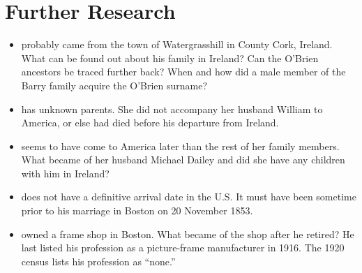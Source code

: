 \chapter{Further Research}

\begin{itemize}

	\item{} probably came from the town of Watergrasshill in County Cork, Ireland. What can be found out about his family in Ireland? Can the O'Brien ancestors be traced further back? When and how did a male member of the Barry family acquire the O'Brien surname?

	\item{} has unknown parents. She did not accompany her husband William to America, or else had died before his departure from Ireland. 

	\item{} seems to have come to America later than the rest of her family members. What became of her husband Michael Dailey and did she have any children with him in Ireland?

	\item{} does not have a definitive arrival date in the U.S. It must have been sometime prior to his marriage in Boston on 20 November 1853.

	\item{} owned a frame shop in Boston. What became of the shop after he retired? He last listed his profession as a picture-frame manufacturer in 1916. The 1920 census lists his profession as ``none.''

\end{itemize}